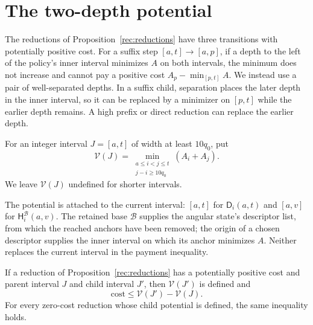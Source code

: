 \section{The two-depth potential}\label{ledger:section}

The reductions of Proposition~\ref{rec:reductions} have three transitions
with potentially positive cost.  For a suffix step \([a,t]\to[a,p]\),
if a depth to the left of the policy's inner interval minimizes \(A\)
on both intervals, the minimum does not increase and cannot pay a
positive cost \(A_p-\min_{[p,t]}A\).  We instead use a pair of well-separated
depths.  In a suffix child, separation places the later depth in the
inner interval, so it can be replaced by a minimizer on \([p,t]\)
while the earlier depth remains.  A high prefix or direct reduction can
replace the earlier depth.

\begin{definition}\label{ledger:potential}
For an integer interval \(J=[a,t]\) of width at least \(10q_0\), put
\begin{equation}\label{ledger:potential-formula}
 \mathcal V(J)=
 \min_{\substack{a\le i<j\le t\\j-i\ge10q_0}}(A_i+A_j).
\end{equation}
We leave \(\mathcal V(J)\) undefined for shorter intervals.
\end{definition}

The potential is attached to the current interval: \([a,t]\) for
\(\mathsf D_i(a,t)\) and \([a,v]\) for
\(\mathsf H_i^{\mathcal B}(a,v)\).
The retained base \(\mathcal B\) supplies the angular state's descriptor
list, from which the reached anchors have been removed; the origin of a chosen descriptor
supplies the inner interval on which its anchor minimizes \(A\).
Neither replaces the current interval in the payment inequality.

\begin{lemma}\label{ledger:payment}
If a reduction of Proposition~\ref{rec:reductions} has a potentially
positive cost and parent interval \(J\) and child interval \(J'\),
then \(\mathcal V(J')\) is defined and
\begin{equation}\label{ledger:payment-inequality}
 \mathrm{cost}\le\mathcal V(J')-\mathcal V(J).
\end{equation}
For every zero-cost reduction whose child potential is defined,
the same inequality holds.
\end{lemma}

